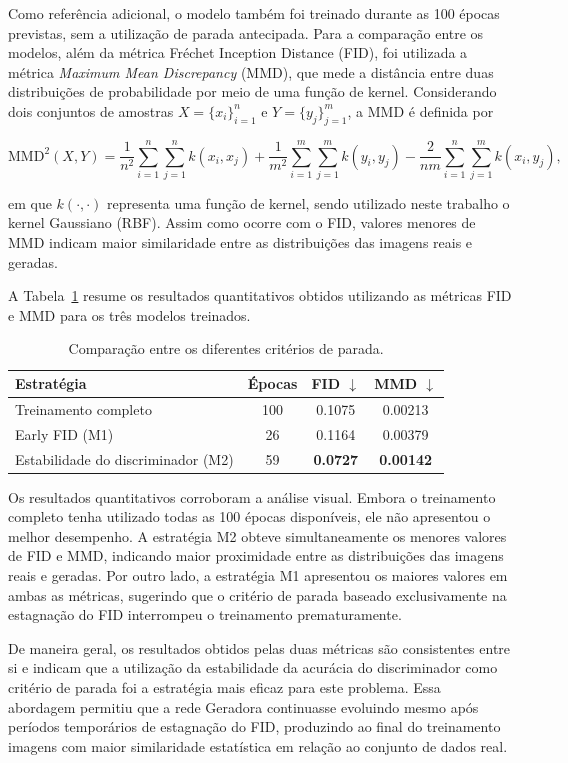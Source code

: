 Como referência adicional, o modelo também foi treinado durante as 100 épocas previstas, sem a utilização de parada antecipada. Para a comparação entre os modelos, além da métrica Fréchet Inception Distance (FID), foi utilizada a métrica \textit{Maximum Mean Discrepancy} (MMD), que mede a distância entre duas distribuições de probabilidade por meio de uma função de kernel. Considerando dois conjuntos de amostras $X=\{x_i\}_{i=1}^{n}$ e $Y=\{y_j\}_{j=1}^{m}$, a MMD é definida por

\begin{equation}
\mathrm{MMD}^2(X,Y)
=
\frac{1}{n^2}
\sum_{i=1}^{n}\sum_{j=1}^{n}
k(x_i,x_j)
+
\frac{1}{m^2}
\sum_{i=1}^{m}\sum_{j=1}^{m}
k(y_i,y_j)
-
\frac{2}{nm}
\sum_{i=1}^{n}\sum_{j=1}^{m}
k(x_i,y_j),
\label{eq:mmd}
\end{equation}

em que $k(\cdot,\cdot)$ representa uma função de kernel, sendo utilizado neste trabalho o kernel Gaussiano (RBF). Assim como ocorre com o FID, valores menores de MMD indicam maior similaridade entre as distribuições das imagens reais e geradas.

A Tabela~\ref{tab:fid_results} resume os resultados quantitativos obtidos utilizando as métricas FID e MMD para os três modelos treinados.

\begin{table}[H]
\centering
\caption{Comparação entre os diferentes critérios de parada.}
\label{tab:fid_results}
\begin{tabular}{lccc}
\hline
\textbf{Estratégia} & \textbf{Épocas} & \textbf{FID} $\downarrow$ & \textbf{MMD} $\downarrow$ \\
\hline
Treinamento completo & 100 & 0.1075 & 0.00213 \\
Early FID (M1) & 26 & 0.1164 & 0.00379 \\
Estabilidade do discriminador (M2) & 59 & \textbf{0.0727} & \textbf{0.00142} \\
\hline
\end{tabular}
\end{table}

Os resultados quantitativos corroboram a análise visual. Embora o treinamento completo tenha utilizado todas as 100 épocas disponíveis, ele não apresentou o melhor desempenho. A estratégia M2 obteve simultaneamente os menores valores de FID e MMD, indicando maior proximidade entre as distribuições das imagens reais e geradas. Por outro lado, a estratégia M1 apresentou os maiores valores em ambas as métricas, sugerindo que o critério de parada baseado exclusivamente na estagnação do FID interrompeu o treinamento prematuramente.

De maneira geral, os resultados obtidos pelas duas métricas são consistentes entre si e indicam que a utilização da estabilidade da acurácia do discriminador como critério de parada foi a estratégia mais eficaz para este problema. Essa abordagem permitiu que a rede Geradora continuasse evoluindo mesmo após períodos temporários de estagnação do FID, produzindo ao final do treinamento imagens com maior similaridade estatística em relação ao conjunto de dados real.